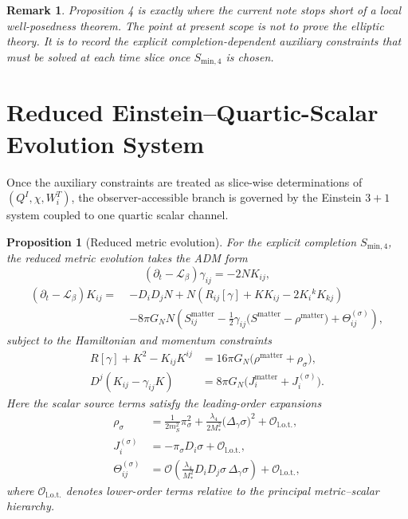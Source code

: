 \documentclass[11pt]{article}
\newcommand{\Ell}{\mathcal{L}}
\newtheorem{proposition}{Proposition}
\newtheorem{remark}{Remark}
\begin{document}
\begin{remark}
Proposition 4 is exactly where the current note stops short of a local well-posedness theorem. The point at present scope is not to prove the elliptic theory. It is to record the explicit completion-dependent auxiliary constraints that must be solved at each time slice once \(S_{\mathrm{min},4}\) is chosen.
\end{remark}

\section{Reduced Einstein--Quartic-Scalar Evolution System}

Once the auxiliary constraints are treated as slice-wise determinations of \((Q^I,\chi,W_i^T)\), the observer-accessible branch is governed by the Einstein \(3+1\) system coupled to one quartic scalar channel.

\begin{proposition}[Reduced metric evolution]
For the explicit completion \(S_{\mathrm{min},4}\), the reduced metric evolution takes the ADM form
\begin{equation}
(\partial_t-\Ell_\beta)\gamma_{ij}=-2N K_{ij},
\label{eq:gammadt}
\end{equation}
\begin{align}
(\partial_t-\Ell_\beta)K_{ij}
=\;&
-D_iD_jN
+N\!\left(R_{ij}[\gamma]+K K_{ij}-2K_i{}^kK_{kj}\right)
\nonumber\\
&-8\pi G_N N
\left(
S_{ij}^{\mathrm{matter}}
-\frac{1}{2}\gamma_{ij}\bigl(S^{\mathrm{matter}}-\rho^{\mathrm{matter}}\bigr)
+\Theta_{ij}^{(\sigma)}
\right),
\label{eq:Kdt}
\end{align}
subject to the Hamiltonian and momentum constraints
\begin{align}
R[\gamma]+K^2-K_{ij}K^{ij}
&=
16\pi G_N\bigl(\rho^{\mathrm{matter}}+\rho_\sigma\bigr),
\label{eq:Hconstraint}
\\
D^j\!\left(K_{ij}-\gamma_{ij}K\right)
&=
8\pi G_N\bigl(J_i^{\mathrm{matter}}+J_i^{(\sigma)}\bigr).
\label{eq:Mconstraint}
\end{align}
Here the scalar source terms satisfy the leading-order expansions
\begin{align}
\rho_\sigma
&=
\frac{1}{2m_S^2}\pi_\sigma^2
+ \frac{\lambda_4}{2M_*^2}\bigl(\Delta_\gamma \sigma\bigr)^2
+ \mathcal O_{\mathrm{l.o.t.}},
\label{eq:rhosigma}
\\
J_i^{(\sigma)}
&=
-\pi_\sigma D_i\sigma
+ \mathcal O_{\mathrm{l.o.t.}},
\label{eq:Jsigma}
\\
\Theta_{ij}^{(\sigma)}
&=
\mathcal O\!\left(\frac{\lambda_4}{M_*^2}D_iD_j\sigma\,\Delta_\gamma \sigma\right)
+ \mathcal O_{\mathrm{l.o.t.}},
\label{eq:Thetasigma}
\end{align}
where \(\mathcal O_{\mathrm{l.o.t.}}\) denotes lower-order terms relative to the principal metric--scalar hierarchy.
\end{proposition}
\end{document}

